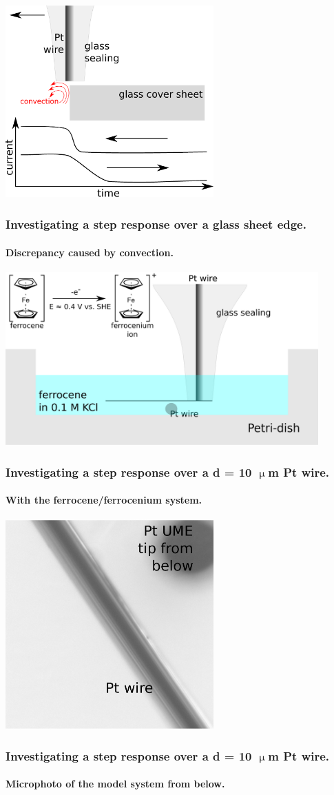 \documentclass{beamer}
\begin{document}
\begin{frame}
        \centering
        \includegraphics[width=0.6\textwidth]{step_conv.eps}
        \frametitle{Investigating a step response over a glass sheet edge.}
        \framesubtitle{Discrepancy caused by convection.}
\vfill
\end{frame}


\begin{frame}
        \centering
        \includegraphics[width=0.9\textwidth]{wire.eps}
        \frametitle{Investigating a step response over a d = 10 $\upmu$m Pt wire.}
        \framesubtitle{With the ferrocene/ferrocenium system.}
\vfill
\end{frame}

\begin{frame}
        \centering
        \includegraphics[width=0.6\textwidth]{wire_photo.eps}
        \frametitle{Investigating a step response over a d = 10 $\upmu$m Pt wire.}
        \framesubtitle{Microphoto of the model system from below.}
\vfill
\end{frame}
\end{document}
